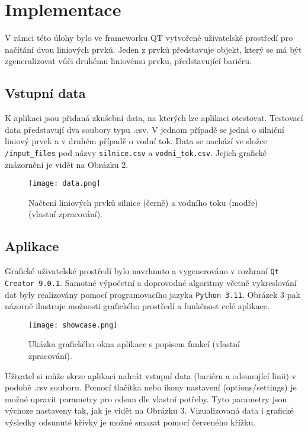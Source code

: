\chapter*{Implementace}
\par V rámci této úlohy bylo ve frameworku QT vytvořené uživatelské prostředí pro načítání dvou liniových prvků. Jeden z prvků představuje objekt, který se má být zgeneralizovat vůči druhému liniovému prvku, představující bariéru.

\section*{Vstupní data}
\par K aplikaci jsou přidaná zkušební data, na kterých lze aplikaci otestovat. Testovací data představují dva soubory typu .csv. V jednom případě se jedná o silniční liniový prvek a v druhém případě o vodní tok. Data se nachází ve složce \verb|/input_files| pod názvy \verb|silnice.csv| a \verb|vodni_tok.csv|. Jejich grafické znázornění je vidět na Obrázku 2.

\begin{figure}[H]
\centering
\texttt{[image: data.png]}
    \caption{Načtení liniových prvků silnice (černě) a vodního toku (modře) (vlastní zpracování).}
\end{figure}

\section*{Aplikace}
\par Grafické uživatelské prostředí bylo navrhnuto a vygenerováno v rozhraní \verb|Qt Creator 9.0.1|. Samotné výpočetní a doprovodné algoritmy včetně vykreslování dat byly realizovány pomocí programovacího jazyka \verb|Python 3.11|. Obrázek 3 pak názorně ilustruje možnosti grafického prostředí a funkčnost celé aplikace.

\begin{figure}[h]
\centering
\texttt{[image: showcase.png]}
    \caption{Ukázka grafického okna aplikace s popisem funkcí (vlastní zpracování).}
\end{figure}

\par Uživatel si může skrze aplikaci nahrát vstupní data (bariéru a odsunující linii) v podobě .csv souboru. Pomocí tlačítka nebo ikony nastavení (options/settings) je možné upravit parametry pro odsun dle vlastní potřeby. Tyto parametry jsou výchoze nastaveny tak, jak je vidět na Obrázku 3. Vizualizovaná data i grafické výsledky odsunuté křivky je možné smazat pomocí červeného křížku. 

